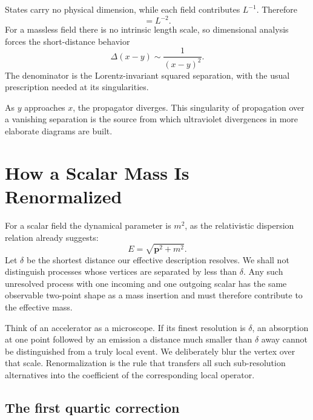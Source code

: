 States carry no physical dimension, while each field contributes \(L^{-1}\).
Therefore
\begin{equation}
[\Delta]=L^{-2}.
\end{equation}
For a massless field there is no intrinsic length scale, so dimensional
analysis forces the short-distance behavior
\begin{equation}
\Delta(x-y)\sim\frac{1}{(x-y)^2}.
\label{eq:massless-propagator}
\end{equation}
The denominator is the Lorentz-invariant squared separation, with the usual
prescription needed at its singularities.

As \(y\) approaches \(x\), the propagator diverges. This singularity of
propagation over a vanishing separation is the source from which ultraviolet
divergences in more elaborate diagrams are built.

\section{How a Scalar Mass Is Renormalized}

For a scalar field the dynamical parameter is \(m^2\), as the relativistic
dispersion relation already suggests:
\begin{equation}
E=\sqrt{\mathbf p^2+m^2}.
\end{equation}
Let \(\delta\) be the shortest distance our effective description resolves.
We shall not distinguish processes whose vertices are separated by less than
\(\delta\). Any such unresolved process with one incoming and one outgoing
scalar has the same observable two-point shape as a mass insertion and must
therefore contribute to the effective mass.

Think of an accelerator as a microscope. If its finest resolution is
\(\delta\), an absorption at one point followed by an emission a distance
much smaller than \(\delta\) away cannot be distinguished from a truly local
event. We deliberately blur the vertex over that scale. Renormalization is
the rule that transfers all such sub-resolution alternatives into the
coefficient of the corresponding local operator.

\subsection{The first quartic correction}

